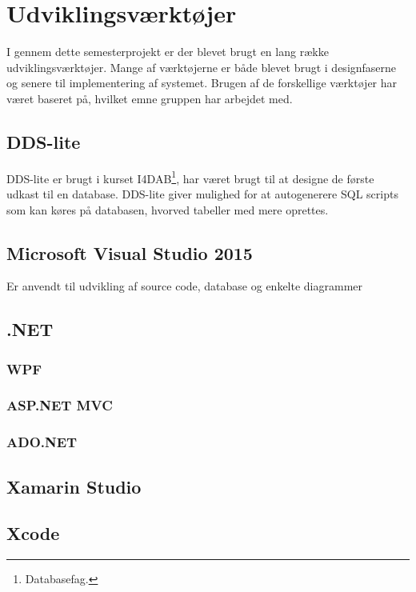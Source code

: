 \chapter{Udviklingsværktøjer}

I gennem dette semesterprojekt er der blevet brugt en lang række udviklingsværktøjer. Mange af værktøjerne er både blevet brugt i designfaserne og senere til implementering af systemet. Brugen af de forskellige værktøjer har været baseret på, hvilket emne gruppen har arbejdet med.

\section*{DDS-lite}
DDS-lite er brugt i kurset I4DAB\footnote{Databasefag.}, har været brugt til at designe de første udkast til en database. DDS-lite giver mulighed for at autogenerere SQL scripts som kan køres på databasen, hvorved tabeller med mere oprettes.

\section*{Microsoft Visual Studio 2015}
Er anvendt til udvikling af source code, database og enkelte diagrammer
\section{.NET}

\subsection{WPF}

\subsection{ASP.NET MVC}

\subsection{ADO.NET}

\section{Xamarin Studio}

\section{Xcode}

